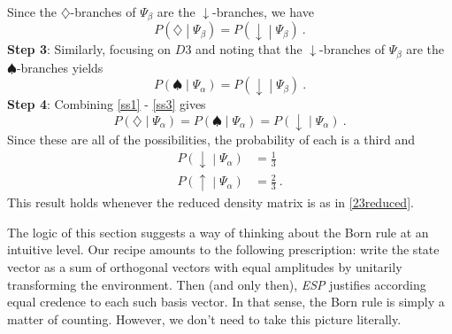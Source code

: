 \documentclass[12pt,onecolumn,secnumarabic,amsmath,amssymb,balancelastpage,nofootinbib]{article}
\begin{document}
Since the $\diamondsuit$-branches of $\Psi_\beta$ are the $\downarrow$-branches, we have
\begin{equation}
P\left(\diamondsuit\middle|\Psi_\beta\right)=P\left(\downarrow\middle|\Psi_\beta\right)\ .
\label{ss2}
\end{equation}
\textbf{Step 3}:  Similarly, focusing on $D3$ and noting that the $\downarrow$-branches of $\Psi_\beta$ are the $\spadesuit$-branches yields
\begin{equation}
P\left(\spadesuit\middle|\Psi_\alpha\right)=P\left(\downarrow\middle|\Psi_\beta\right)\ .
\label{ss3}
\end{equation}
\textbf{Step 4}:  Combining \eqref{ss1} - \eqref{ss3} gives
\begin{equation}
P\left(\diamondsuit\middle|\Psi_\alpha\right)=P\left(\spadesuit\middle|\Psi_\alpha\right)=P\left(\downarrow\middle|\Psi_\alpha\right)\ .
\end{equation}
Since these are all of the possibilities, the probability of each is a third and 
\begin{align}
P\left(\downarrow\middle|\Psi_\alpha\right)&=\frac{1}{3}
\nonumber
\\
P\left(\uparrow\middle|\Psi_\alpha\right)&=\frac{2}{3}\ .
\end{align}
This result holds whenever the reduced density matrix is as in \eqref{23reduced}.

The logic of this section suggests a way of thinking about the Born rule at an intuitive level. Our recipe amounts to the following prescription: write the state vector as a sum of orthogonal vectors with equal amplitudes by unitarily transforming the environment. Then (and only then), \emph{ESP} justifies according equal credence to each such basis vector.  In that sense, the Born rule is simply a matter of counting.  However, we don't need to take this picture literally.
\end{document}
